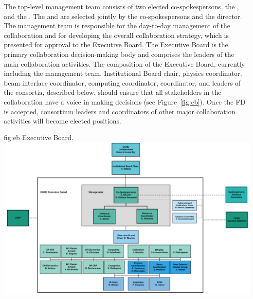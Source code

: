 The top-level  management team consists of two elected co-spokespersons, the , and the . The  and  are selected jointly by the co-spokespersons and the  director. The management team is responsible for the day-to-day management of the collaboration and for developing the overall collaboration strategy, which is presented for approval to the Executive Board. The Executive Board is the primary collaboration decision-making body and comprises the leaders of the main collaboration activities. The composition of the Executive Board, currently including the  management team, Institutional Board chair, physics coordinator, beam interface coordinator, computing coordinator,  coordinator, and leaders of the  consortia, described below, should ensure that all stakeholders in the collaboration have a voice in making decisions (see Figure~\ref{fig:eb}). 
Once the  FD  is accepted, consortium leaders and coordinators of other major collaboration activities will become elected positions.

\begin{dunefigure}	
{fig:eb}{ Executive Board.}
\includegraphics[width=1.0\textwidth]{graphics/eb.pdf}
\end{dunefigure}

